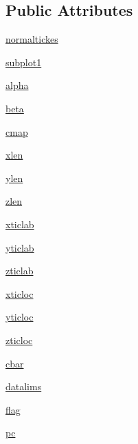 \subsection*{Public Attributes}
\begin{DoxyCompactItemize}
\item 
\hyperlink{class_uni_dec_1_1unidec__modules_1_1plot3d_1_1_cube_plot_a00304e0699b051535b8bd2acb43f882d}{normaltickes}
\item 
\hyperlink{class_uni_dec_1_1unidec__modules_1_1plot3d_1_1_cube_plot_aa94037e20237e7aec09437bf6cc50919}{subplot1}
\item 
\hyperlink{class_uni_dec_1_1unidec__modules_1_1plot3d_1_1_cube_plot_aca9f301e900fd38acdf40ce5a6422cb6}{alpha}
\item 
\hyperlink{class_uni_dec_1_1unidec__modules_1_1plot3d_1_1_cube_plot_a5d63596698d6f3ccdfd9a3b774dc7342}{beta}
\item 
\hyperlink{class_uni_dec_1_1unidec__modules_1_1plot3d_1_1_cube_plot_a24a26e7c0f400a5f8874ccd4fbb3d6af}{cmap}
\item 
\hyperlink{class_uni_dec_1_1unidec__modules_1_1plot3d_1_1_cube_plot_ac19deff6fed6fe986b882a0c89e9f123}{xlen}
\item 
\hyperlink{class_uni_dec_1_1unidec__modules_1_1plot3d_1_1_cube_plot_a2b7d0db8e3c7998fcb8d0c5e23dc8ef8}{ylen}
\item 
\hyperlink{class_uni_dec_1_1unidec__modules_1_1plot3d_1_1_cube_plot_adc49e4c1620dea5dc72b0cd640c0f72b}{zlen}
\item 
\hyperlink{class_uni_dec_1_1unidec__modules_1_1plot3d_1_1_cube_plot_a15067fc56f09cdd9cec416b535fc0543}{xticlab}
\item 
\hyperlink{class_uni_dec_1_1unidec__modules_1_1plot3d_1_1_cube_plot_a6485ef8a24d0d9757b1542bd62beefbb}{yticlab}
\item 
\hyperlink{class_uni_dec_1_1unidec__modules_1_1plot3d_1_1_cube_plot_a6e40b70f52af024b9a43a8e65da546b7}{zticlab}
\item 
\hyperlink{class_uni_dec_1_1unidec__modules_1_1plot3d_1_1_cube_plot_a8d1a9a3830c639c21173e92e60c8f56b}{xticloc}
\item 
\hyperlink{class_uni_dec_1_1unidec__modules_1_1plot3d_1_1_cube_plot_affe7f422203a9093fbe56b45ea0eeac5}{yticloc}
\item 
\hyperlink{class_uni_dec_1_1unidec__modules_1_1plot3d_1_1_cube_plot_a2b0b40386d29ecd1751114b53d795a90}{zticloc}
\item 
\hyperlink{class_uni_dec_1_1unidec__modules_1_1plot3d_1_1_cube_plot_a82f28680bad22224b64508bc34fee736}{cbar}
\item 
\hyperlink{class_uni_dec_1_1unidec__modules_1_1plot3d_1_1_cube_plot_aeea5dbc410b08c4508440ad8b6bf1a09}{datalims}
\item 
\hyperlink{class_uni_dec_1_1unidec__modules_1_1plot3d_1_1_cube_plot_ae0e611e263cf593c08f04492c3216cf8}{flag}
\item 
\hyperlink{class_uni_dec_1_1unidec__modules_1_1plot3d_1_1_cube_plot_a92dc316f43704b4418f87ddeb3074a35}{pc}
\end{DoxyCompactItemize}


